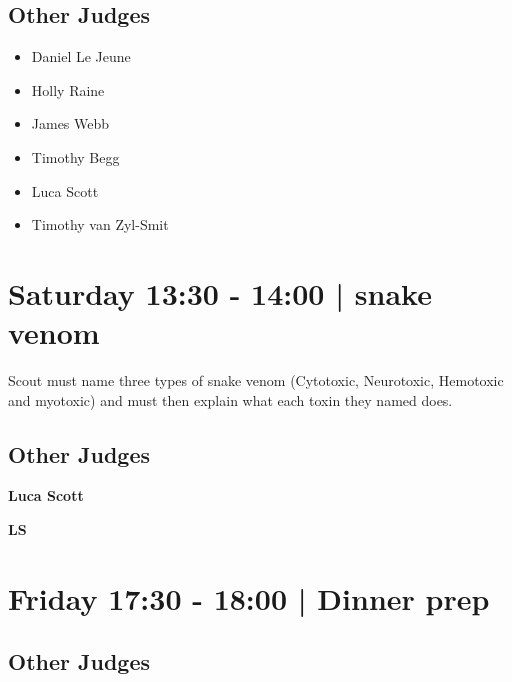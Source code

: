 \documentclass[10pt]{article}
\newcommand{\newtitle}[1]{\begin{center}{\Huge\bfseries #1 }\\ \vspace{5mm}\end{center}}
\newcommand{\newsubtitle}[1]{\begin{center}{\color{grey}\Large\bfseries #1 }\\ \vspace{5mm}\end{center}}
\begin{document}
        \subsection*{Other Judges}
        
            \begin{itemize}
                            \item Daniel Le Jeune
                            \item Holly Raine
                            \item James Webb
                            \item Timothy Begg
                            \item Luca Scott
                            \item Timothy van Zyl-Smit
                        \end{itemize}
        

            \section*{Saturday 13:30
        -
        14:00
        |
         snake venom}
        
                            Scout must name three types of snake venom (Cytotoxic, Neurotoxic, Hemotoxic and myotoxic) and must then explain what each toxin they named does.
        
        \subsection*{Other Judges}
        
            \begin{itemize}
                        \end{itemize}
        

    
	\clearpage

		\newtitle{Luca Scott}
	\newsubtitle{LS}

            \section*{Friday 17:30
        -
        18:00
        |
         Dinner prep}
        
                
        \subsection*{Other Judges}
        
\end{document}
